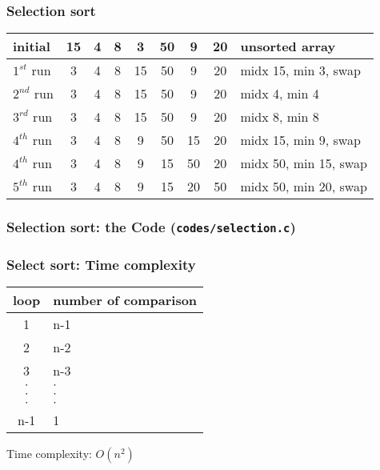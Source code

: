 \documentclass[newPxFont,sthlmFooter,nooffset]{beamer}
\begin{document}
\begin{frame}[t, fragile]
  \frametitle{Selection sort}
  \begin{tabular}{p{1.5cm}|| c | c | c | c | c | c | c |p{4cm}}
initial & 15 & 4  & 8  & 3  & 50 & 9 & 20 & unsorted array \\ \hline
$1^{st}$ run & \color{red}3  & 4 & 8  & \color{red}15  & 50 & 9 & 20 & midx 15, min 3, swap \pause\\ [0.8em] \hline
$2^{nd}$ run & \color{blue}3  & \color{red}4 & 8  & 15  & 50 & 9 & 20 & midx 4, min 4 \pause\\  [0.8em] \hline
$3^{rd}$ run & \color{blue}3  & \color{blue}4 & \color{red}8  & 15  & 50 & 9 & 20 & midx 8, min 8 \pause\\  [0.8em] \hline
$4^{th}$ run & \color{blue}3  & \color{blue}4 &\color{blue} 8  & \color{red}9  & 50 & \color{red}15 & 20 & midx 15, min 9, swap \pause\\  [0.8em] \hline
$4^{th}$ run & \color{blue}3  & \color{blue}4 &\color{blue} 8  & \color{blue}9  & \color{red}15 & \color{red}50 & 20 & midx 50, min 15, swap \pause\\  [0.8em] \hline
$5^{th}$ run & \color{blue}3  & \color{blue}4 &\color{blue} 8  & \color{blue}9  & \color{blue}15 & \color{red}20 & \color{red}50 & midx 50, min 20, swap \\  [0.8em]
  \end{tabular}

\end{frame}


\begin{frame}[t, fragile]
  \frametitle{Selection sort: the Code (\texttt{codes/selection.c})}
  

\end{frame}
\begin{frame}[t]
	\frametitle{Select sort: Time complexity}
	\begin{center}
		\begin{tabular}{c | p{3cm}}
			loop & \scriptsize{number of comparison} \\ \hline
			1    & n-1 \\
			2    & n-2 \\
			3    & n-3 \\
			$\cdot$ &  $\cdot$ \\
			$\cdot$ &  $\cdot$ \\
			$\cdot$ &  $\cdot$ \\
			n-1  &  1 \\
		\end{tabular}
	\end{center}
	Time complexity: $O(n^2)$
\end{frame}
\end{document}
